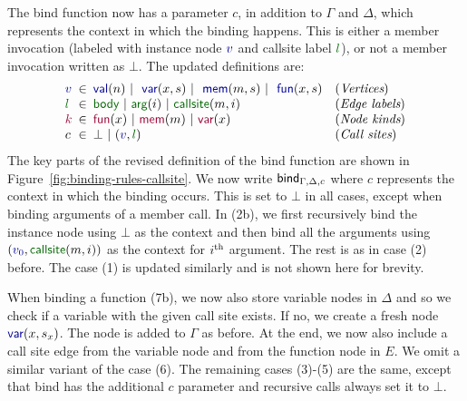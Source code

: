 \documentclass[sigplan,10pt]{acmart}\settopmatter{printfolios=true,printccs=false,printacmref=false}
\theoremstyle{plain}
\theoremstyle{definition}
\newcommand{\ident}[1]{\textnormal{\sffamily #1}}
\newcommand{\bndclr}[1]{\textcolor{kvdclr}{#1}}
\newcommand{\bkndclr}[1]{\textcolor{prepclr}{#1}}
\newcommand{\blblclr}[1]{\textcolor{numclr}{#1}}
\newcommand{\bnd}[1]{\textnormal{\textcolor{kvdclr}{\sffamily #1}}}
\newcommand{\bknd}[1]{\textnormal{\textcolor{prepclr}{\sffamily #1}}}
\newcommand{\blbl}[1]{\textnormal{\textcolor{numclr}{\sffamily #1}}}
\begin{document}
The \ident{bind} function now has a parameter $c$, in addition to $\Gamma$ and $\Delta$, which 
represents the context in which the binding happens. This is either a member invocation (labeled 
with instance node $\bndclr{v}$ and \blbl{callsite} label $\blblclr{l}$), or not a member 
invocation written as $\bot$. The updated definitions are:
%
\begin{equation*}
\begin{array}{lcll}
\bndclr{v} &\hspace{-0.5em}\in\hspace{-0.5em}&\bnd{val}(n)~|~\bnd{var}(x, s)~|~\bnd{mem}(m, s)~|~\bnd{fun}(x, s)&(\textit{Vertices})\\
\blblclr{l}&\hspace{-0.5em}\in\hspace{-0.5em}&\blbl{body}~|~\blbl{arg}(i)~|~\blbl{callsite}(m,i)&(\textit{Edge labels})\\
\bkndclr{k}&\hspace{-0.5em}\in\hspace{-0.5em}&\bknd{fun}(x)~|~\bknd{mem}(m)~|~\bknd{var}(x)&(\textit{Node kinds})\\
          c&\hspace{-0.5em}\in\hspace{-0.5em}&\bot ~|~(\bndclr{v}, \blblclr{l})&(\textit{Call sites})\\
\end{array}
\end{equation*}
%
The key parts of the revised definition of the \ident{bind} function are shown in Figure~\ref{fig:binding-rules-callsite}.
We now write $\ident{bind}_{\Gamma,\Delta,c}$ where $c$ represents the context in which the
binding occurs. This is set to $\bot$ in all cases, except when binding arguments of a member call.
In (2b), we first recursively bind the instance node using $\bot$ as the context and then 
bind all the arguments using $(\bndclr{v_0}, \blbl{callsite}(m, i))$ as the context for $i^{\textnormal{th}}$ 
argument. The rest is as in case (2) before. The case (1) is updated similarly and is not shown 
here for brevity.

When binding a function (7b), we now also store variable nodes in $\Delta$ and so we check if a 
variable with the given call site exists. If no, we create a fresh node $\bnd{var}(x, s_x)$.
The node is added to $\Gamma$ as before. At the end, we now also include a call site edge from the 
variable node and from the function node in $E$. We omit a similar variant of the case (6).
The remaining cases (3)-(5) are the same, except that \ident{bind} has the additional $c$ parameter
and recursive calls always set it to $\bot$.
\end{document}
